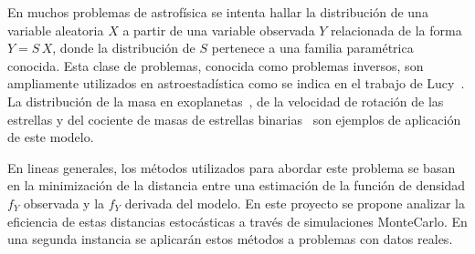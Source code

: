\documentclass[11pt]{article}
\begin{document}
%
%

En muchos problemas de astrofísica se intenta hallar la distribución de una variable aleatoria $X$ a partir de una variable observada $Y$ relacionada de la forma $Y = S\,X$, donde la distribución de $S$ pertenece
a una familia paramétrica conocida. Esta clase de problemas, conocida como problemas inversos, son ampliamente utilizados en astroestadística como se indica en el trabajo de Lucy~\cite{Lucy1994}. La distribución de la masa en exoplanetas~\cite{Jorissen2001},  de la velocidad de rotación de las estrellas y del cociente de masas de estrellas binarias~\cite{Cure2014,Cure2015} son ejemplos de aplicación de este modelo.

En lineas generales, los métodos utilizados para abordar este problema se basan en la minimización de la distancia entre una estimación de la función de densidad $f_{Y}$ observada y la $f_{Y}$ derivada del modelo. 
En este proyecto se propone analizar la eficiencia de estas distancias estocásticas a través de simulaciones MonteCarlo. En una segunda instancia se aplicarán estos métodos a problemas con datos reales.

% 
\end{document}
